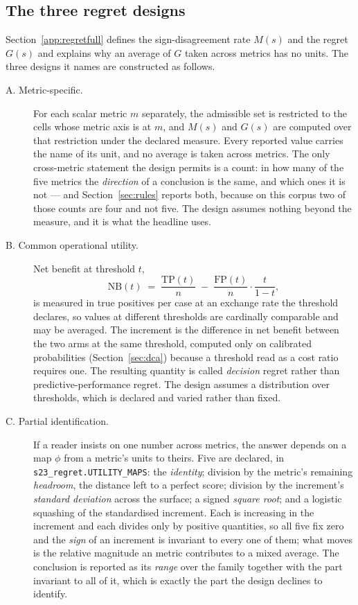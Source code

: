 \subsection*{The three regret designs}
\label{app:regretdesigns}

Section~\ref{app:regretfull} defines the sign-disagreement rate $M(s)$ and the regret
$G(s)$ and explains why an average of $G$ taken across metrics has no
units. The three designs it names are constructed as follows.

\begin{description}
\item[A. Metric-specific.] For each scalar metric $m$ separately, the
admissible set is restricted to the cells whose metric axis is at $m$, and
$M(s)$ and $G(s)$ are computed over that restriction under the declared
measure. Every reported value carries the name of its unit, and no average is
taken across metrics. The only cross-metric statement the design
permits is a count: in how many of the five metrics the \emph{direction}
of a conclusion is the same, and which ones it is not --- and
Section~\ref{sec:rules} reports both, because on this corpus two of those
counts are four and not five. The design assumes nothing beyond the measure,
and it is what the headline uses.

\item[B. Common operational utility.] Net benefit at threshold $t$,
\[
\mathrm{NB}(t) \;=\; \frac{\mathrm{TP}(t)}{n}
\;-\; \frac{\mathrm{FP}(t)}{n}\cdot\frac{t}{1-t},
\]
is measured in true positives per case at an exchange rate the threshold
declares, so values at different thresholds are cardinally comparable and may
be averaged. The increment is the difference in net benefit between the two
arms at the same threshold, computed only on calibrated probabilities
(Section~\ref{sec:dca}) because a threshold read as a cost ratio requires one.
The resulting quantity is called \emph{decision} regret rather than
predictive-performance regret. The design assumes a distribution over
thresholds, which is declared and varied rather than fixed.

\item[C. Partial identification.] If a reader insists on one number across
metrics, the answer depends on a map $\phi$ from a metric's units to
theirs. Five are declared, in
\texttt{s23\_regret.UTILITY\_MAPS}: the \emph{identity}; division by the
metric's remaining \emph{headroom}, the distance left to a perfect score;
division by the increment's \emph{standard deviation} across the surface; a
signed \emph{square root}; and a logistic squashing of the standardised
increment. Each is increasing in the increment and each divides only by
positive quantities, so all five fix zero and the \emph{sign} of an increment
is invariant to every one of them; what moves is the relative magnitude an
metric contributes to a mixed average. The conclusion is reported as its
\emph{range} over the family together with the part invariant to all of it,
which is exactly the part the design declines to identify.
\end{description}

